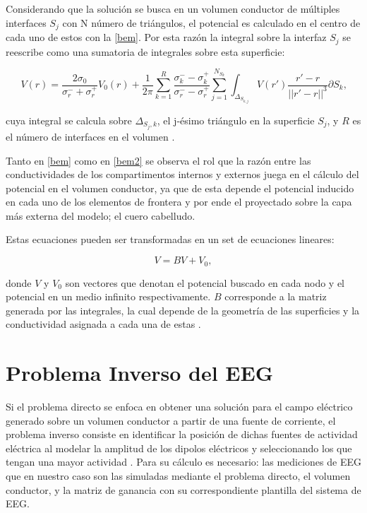Considerando que la solución se busca en un volumen conductor de múltiples interfaces $S_{j}$ con N número de triángulos, el potencial es calculado en el centro de cada uno de estos con la \cref{bem}. Por esta razón la integral sobre la interfaz $S_{j}$ se reescribe como una sumatoria de integrales sobre esta superficie:

\begin{equation}
	\label{bem2}
	V(r) = \frac{2\sigma_{0}}{\sigma_{r}^{-} + {\sigma_{r}^{+}}} V_{0}(r) + \frac{1}{2\pi} \sum_{k=1}^{R}\frac{\sigma_{k}^{-}-\sigma_{k}^{+}}{\sigma_{r}^{-}-\sigma_{r}^{+}} \sum_{j=1}^{N_{S_{k}}} \int_{\Delta_{S_{k,j}}} V(r') \frac{r'-r}{||r'-r||^3}\partial S_{k}\text{,}
\end{equation}

cuya integral se calcula sobre $\Delta_{S_{j},k}$, el j-ésimo triángulo en la superficie $S_{j}$, y $R$ es el número de interfaces en el volumen \cite{Hallez2007}.

Tanto en \cref{bem} como en \cref{bem2} se observa el rol que la razón entre las conductividades de los compartimentos internos y externos juega en el cálculo del potencial en el volumen conductor, ya que de esta depende el potencial inducido en cada uno de los elementos de frontera y por ende el proyectado sobre la capa más externa del modelo; el cuero cabelludo.

Estas ecuaciones pueden ser transformadas en un set de ecuaciones lineares:

\begin{equation}
	\label{lineal}
	V = BV + V_{0},
\end{equation}

donde $V$ y $V_{0}$ son vectores que denotan el potencial buscado en cada nodo y el potencial en un medio infinito respectivamente. $B$ corresponde a la matriz generada por las integrales, la cual depende de la geometría de las superficies y la conductividad asignada a cada una de estas \cite{Hallez2007}.

\section{Problema Inverso del EEG}
\label{sec:intro:inverse}

Si el problema directo se enfoca en obtener una solución para el campo eléctrico generado sobre un volumen conductor a partir de una fuente de corriente, el problema inverso consiste en identificar la posición de dichas fuentes de actividad eléctrica al modelar la amplitud de los dipolos eléctricos y seleccionando los que tengan una mayor actividad \cite{Baillet2001}. Para su cálculo es necesario: las mediciones de EEG que en nuestro caso son las simuladas mediante el problema directo, el volumen conductor, y la matriz de ganancia con su correspondiente plantilla del sistema de EEG.

